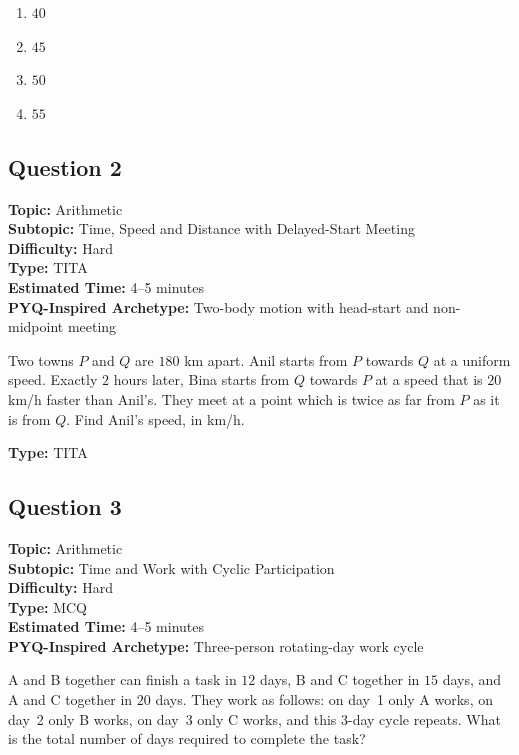 \documentclass[11pt]{article}
\begin{document}
\begin{enumerate}[label=(\Alph*)]
    \item \(40\)
    \item \(45\)
    \item \(50\)
    \item \(55\)
\end{enumerate}

\subsection*{Question 2}

\textbf{Topic:} Arithmetic \\
\textbf{Subtopic:} Time, Speed and Distance with Delayed-Start Meeting \\
\textbf{Difficulty:} Hard \\
\textbf{Type:} TITA \\
\textbf{Estimated Time:} 4--5 minutes \\
\textbf{PYQ-Inspired Archetype:} Two-body motion with head-start and non-midpoint meeting

\begin{tcolorbox}
Two towns \(P\) and \(Q\) are \(180\) km apart. Anil starts from \(P\) towards \(Q\) at a uniform speed. Exactly \(2\) hours later, Bina starts from \(Q\) towards \(P\) at a speed that is \(20\) km/h faster than Anil's. They meet at a point which is twice as far from \(P\) as it is from \(Q\). Find Anil's speed, in km/h.
\end{tcolorbox}

\textbf{Type:} TITA

\subsection*{Question 3}

\textbf{Topic:} Arithmetic \\
\textbf{Subtopic:} Time and Work with Cyclic Participation \\
\textbf{Difficulty:} Hard \\
\textbf{Type:} MCQ \\
\textbf{Estimated Time:} 4--5 minutes \\
\textbf{PYQ-Inspired Archetype:} Three-person rotating-day work cycle

\begin{tcolorbox}
A and B together can finish a task in \(12\) days, B and C together in \(15\) days, and A and C together in \(20\) days. They work as follows: on day~1 only A works, on day~2 only B works, on day~3 only C works, and this 3-day cycle repeats. What is the total number of days required to complete the task?
\end{tcolorbox}
\end{document}
